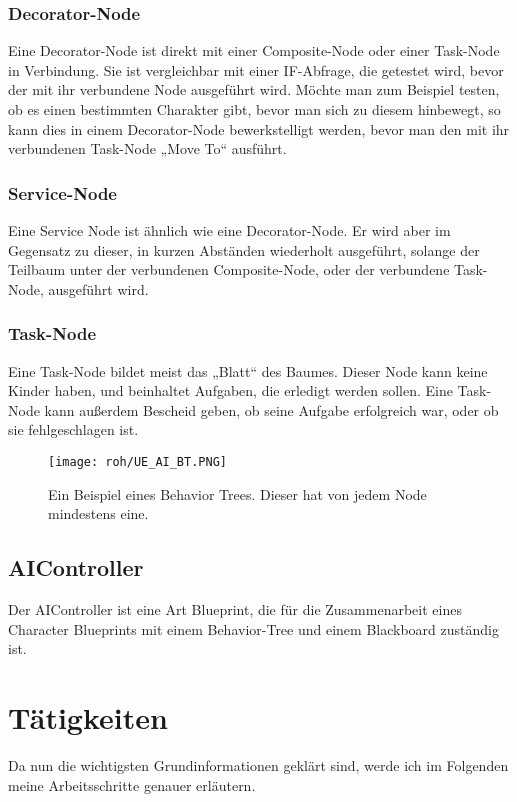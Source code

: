 \subsubsection{Decorator-Node}
Eine Decorator-Node ist direkt mit einer Composite-Node oder einer Task-Node in Verbindung.
Sie ist vergleichbar mit einer IF-Abfrage, die getestet wird, bevor der mit ihr verbundene Node ausgeführt wird.
Möchte man zum Beispiel testen, ob es einen bestimmten Charakter gibt, bevor man sich zu diesem hinbewegt, so kann dies in einem Decorator-Node bewerkstelligt werden, bevor man den mit ihr verbundenen Task-Node „Move To“ ausführt.
\subsubsection{Service-Node}
Eine Service Node ist ähnlich wie eine Decorator-Node.
Er wird aber im Gegensatz zu dieser, in kurzen Abständen wiederholt ausgeführt, solange der Teilbaum unter der verbundenen Composite-Node, oder der verbundene Task-Node, ausgeführt wird.
\subsubsection{Task-Node}
Eine Task-Node bildet meist das „Blatt“ des Baumes.
Dieser Node kann keine Kinder haben, und beinhaltet Aufgaben, die erledigt werden sollen. Eine Task-Node kann außerdem Bescheid geben, ob seine Aufgabe erfolgreich war, oder ob sie fehlgeschlagen ist.
\begin{figure}[H]
    \centering
    \texttt{[image: roh/UE\_AI\_BT.PNG]}
    \caption{Ein Beispiel eines Behavior Trees. Dieser hat von jedem Node mindestens eine.}
    \label{UE:AI_BT}
\end{figure}
\subsection{AIController}
Der AIController ist eine Art Blueprint, die für die Zusammenarbeit eines Character Blueprints mit einem Behavior-Tree und einem Blackboard zuständig ist.\citep{ue:AIAIController}

\section{Tätigkeiten}
Da nun die wichtigsten Grundinformationen geklärt sind, werde ich im Folgenden meine Arbeitsschritte genauer erläutern.
